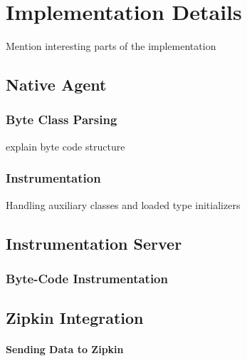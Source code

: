 \chapter{Implementation Details}
Mention interesting parts of the implementation
\section{Native Agent}
\subsection{Byte Class Parsing}
explain byte code structure
\subsection{Instrumentation}
Handling auxiliary classes and loaded type initializers
\section{Instrumentation Server}
\subsection{Byte-Code Instrumentation}
\section{Zipkin Integration}
\subsubsection{Sending Data to Zipkin}
